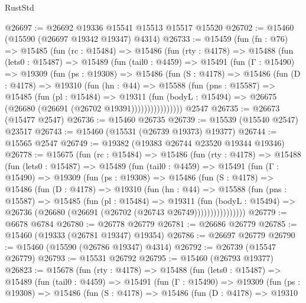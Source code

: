\begin{lexlean}{RustStd}
\begin{coremodule}
@26697 := @26692 @19336 @15541 @15513 @15517 @15520
@26702 := @15460 (@15590 (@26697 @19342 @19347) @4314)
@26733 := @15459
    (fun (fn : @76) =>
    @15485
      (fun (rc : @15484) =>
      @15486
        (fun (rty : @4178) =>
        @15488
          (fun (lets0 : @15487) =>
          @15489
            (fun (tail0 : @4459) =>
            @15491
              (fun (Γ : @15490) =>
              @19309
                (fun (ps : @19308) =>
                @15486
                  (fun (S : @4178) =>
                  @15486
                    (fun (D : @4178) =>
                    @19310
                      (fun (hn : @44) =>
                      @15588
                        (fun (pns : @15587) =>
                        @15485
                          (fun (pl : @15484) =>
                          @19311
                            (fun (bodyL : @15494) =>
                            @26675 (@26680 (@26691 (@26702 @19391))))))))))))))))
    @2547
@26735 := @26673 (@15477 @2547)
@26736 := @15460 @26735
@26739 := @15539 (@15540 @2547) @23517
@26743 := @15460 (@15531 (@26739 @19373) @19377)
@26744 := @15565 @2547
@26749 := @19382 (@19383 @26744 @23520 @19344 @19346)
@26778 := @15675
    (fun (rc : @15484) =>
    @15486
      (fun (rty : @4178) =>
      @15488
        (fun (lets0 : @15487) =>
        @15489
          (fun (tail0 : @4459) =>
          @15491
            (fun (Γ : @15490) =>
            @19309
              (fun (ps : @19308) =>
              @15486
                (fun (S : @4178) =>
                @15486
                  (fun (D : @4178) =>
                  @19310
                    (fun (hn : @44) =>
                    @15588
                      (fun (pns : @15587) =>
                      @15485
                        (fun (pl : @15484) =>
                        @19311
                          (fun (bodyL : @15494) =>
                          @26736 (@26680 (@26691 (@26702 (@26743 @26749))))))))))))))))
@26779 := @6678 @6784
@26780 := @26778 @26779
@26781 := @26686 @26779
@26785 := @15460 (@19333 (@26781 @19347) @19354)
@26786 := @26697 @26779
@26790 := @15460 (@15590 (@26786 @19347) @4314)
@26792 := @26739 (@15547 @26779)
@26793 := @15531 @26792
@26795 := @15460 (@26793 @19377)
@26823 := @15678
    (fun (rty : @4178) =>
    @15488
      (fun (lets0 : @15487) =>
      @15489
        (fun (tail0 : @4459) =>
        @15491
          (fun (Γ : @15490) =>
          @19309
            (fun (ps : @19308) =>
            @15486
              (fun (S : @4178) =>
              @15486
                (fun (D : @4178) =>
                @19310

\end{coremodule}
\end{lexlean}
